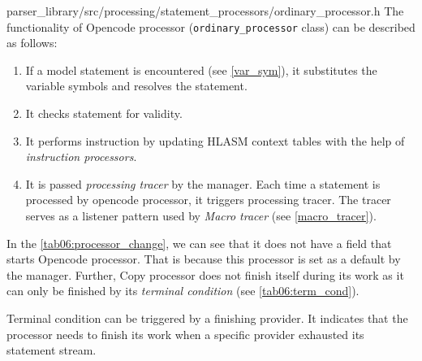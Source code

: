 {parser\_library/src/processing/statement\_processors/ordinary\_processor.h}
\label{ord_proc}
The functionality of Opencode processor (\texttt{ordinary\_processor} class) can be described as follows:
\begin{enumerate}
	\item If a model statement is encountered (see \cref{var_sym}), it substitutes the variable symbols and resolves the statement.
	\item It checks statement for validity.
	\item It performs instruction by updating HLASM context tables with the help of \emph{instruction processors}.
	\item It is passed \emph{processing tracer} by the manager. Each time a statement is processed by opencode processor, it triggers processing tracer. The tracer serves as a listener pattern used by \emph{Macro tracer} (see \cref{macro_tracer}).
\end{enumerate}

\vspace{0.5cm}

In the \cref{tab06:processor_change}, we can see that it does not have a field that starts Opencode processor. That is because this processor is set as a default by the manager. Further, Copy processor does not finish itself during its work as it can only be finished by its \emph{terminal condition} (see \cref{tab06:term_cond}). 

Terminal condition can be triggered by a finishing provider. It indicates that the processor needs to finish its work when a specific provider exhausted its statement stream.

\newcommand{\fin}{\textcolor{red}{finish}}
\newcommand{\strt}[1]{\textcolor{blue}{start #1}}
\newcommand{\cont}{\textcolor{green}{continue}}

